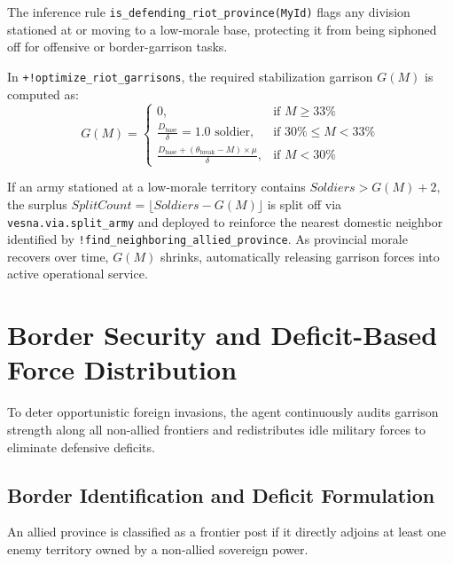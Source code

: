 The inference rule \texttt{is\_defending\_riot\_province(MyId)} flags any division stationed at or moving to a low-morale base, protecting it from being siphoned off for offensive or border-garrison tasks.

In \texttt{+!optimize\_riot\_garrisons}, the required stabilization garrison $G(M)$ is computed as:
\begin{equation}
    \label{eq:riot_formula}
    G(M) = \begin{cases}
    0, & \text{if } M \ge 33\% \\
    \frac{D_{\text{base}}}{\delta} = 1.0 \text{ soldier}, & \text{if } 30\% \le M < 33\% \\
    \frac{D_{\text{base}} + (\theta_{\text{break}} - M) \times \mu}{\delta}, & \text{if } M < 30\%
    \end{cases}
\end{equation}

If an army stationed at a low-morale territory contains $\mathit{Soldiers} > G(M) + 2$, the surplus $\mathit{SplitCount} = \lfloor \mathit{Soldiers} - G(M) \rfloor$ is split off via \texttt{vesna.via.split\_army} and deployed to reinforce the nearest domestic neighbor identified by \texttt{!find\_neighboring\_allied\_province}. As provincial morale recovers over time, $G(M)$ shrinks, automatically releasing garrison forces into active operational service.

\section{Border Security and Deficit-Based Force Distribution}
\label{sec:impl_border_distribution}

To deter opportunistic foreign invasions, the agent continuously audits garrison strength along all non-allied frontiers and redistributes idle military forces to eliminate defensive deficits.

\subsection{Border Identification and Deficit Formulation}
\label{subsec:border_deficit}

An allied province is classified as a frontier post if it directly adjoins at least one enemy territory owned by a non-allied sovereign power.

